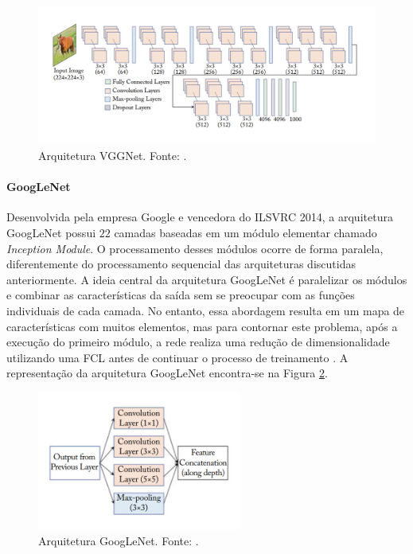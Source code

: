 \begin{figure}[!ht]
	\centering
	\caption{Arquitetura VGGNet. Fonte: \cite{ref:khan}.}
	\label{img:vggnet}
	\includegraphics[width=1\textwidth]{./img/vggnet}

\end{figure}

\paragraph{GoogLeNet} Desenvolvida pela empresa Google e vencedora do ILSVRC 2014, a arquitetura GoogLeNet possui $22$ camadas baseadas em um módulo elementar chamado \emph{Inception Module}. O processamento desses módulos ocorre de forma paralela, diferentemente do processamento sequencial das arquiteturas discutidas anteriormente. A ideia central da arquitetura GoogLeNet é paralelizar os módulos e combinar as características da saída sem se preocupar com as funções individuais de cada camada. No entanto, essa abordagem resulta em um mapa de características com muitos elementos, mas para contornar este problema, após a execução do primeiro módulo, a rede realiza uma redução de dimensionalidade utilizando uma FCL antes de continuar o processo de treinamento \cite{ref:khan}. A representação da arquitetura GoogLeNet encontra-se na Figura \ref{img:googlenet}.

\begin{figure}[!ht]
	\centering
	\caption{Arquitetura GoogLeNet. Fonte: \cite{ref:khan}.}
	\label{img:googlenet}
	\includegraphics[width=0.6\textwidth]{./img/googlenet}

\end{figure}
